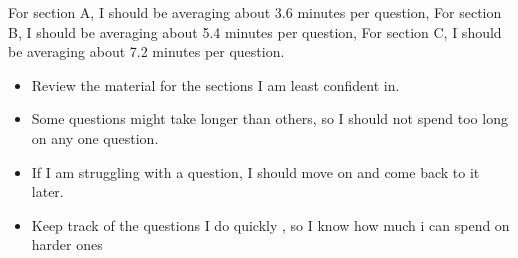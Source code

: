\documentclass[a4paper]{tufte-handout}
\begin{document}
\begin{question}
  For section A, I should be averaging about 3.6 minutes per question,
  For section B, I should be averaging about 5.4 minutes per question,
  For section C, I should be averaging about 7.2 minutes per question.

\qsubpart

  \begin{itemize}
  \item Review the material for the sections I am least confident in.
  \item Some questions might take longer than others, so I should not spend too long on any one question.
  \item If I am struggling with a question, I should move on and come back to it later.
  \item Keep track of the questions I do quickly , so I know how much i can spend on harder ones
  \end{itemize}

\end{question}

\clearpage
\end{document}
